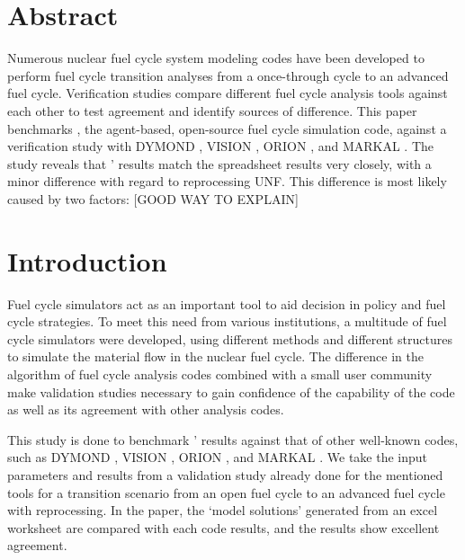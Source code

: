 \section{Abstract}
Numerous nuclear fuel cycle system modeling codes
have been developed to perform fuel cycle transition
analyses from a once-through cycle to an advanced
fuel cycle. Verification studies compare different
fuel cycle analysis tools against each other to
test agreement and identify sources of difference.
This paper benchmarks \Cyclus, the agent-based,
open-source fuel cycle simulation code, against
a verification study \cite{feng_standardized_2016} with
DYMOND \cite{yacout_2005_modeling},
VISION \cite{jacobson_2010_verifiable},
ORION \cite{gregg_2012_analysis}, and
MARKAL \cite{shay_2006_epa}. The study reveals
that \Cyclus' results match the spreadsheet results
very closely, with a minor difference with regard to
reprocessing \gls{UNF}. This difference is most
likely caused by two factors:
[GOOD WAY TO EXPLAIN]

\section{Introduction}
Fuel cycle simulators act as an important tool to
aid decision in policy and fuel cycle strategies.
To meet this need from various institutions, a
multitude of fuel cycle simulators were developed,
using different methods and different structures
to simulate the material flow in the nuclear fuel cycle.
The difference in the algorithm of fuel cycle analysis
codes combined with a small user community make
validation studies necessary to gain
confidence of the capability of the code as well as its
agreement with other analysis codes.

This study is done to benchmark \Cyclus' results
against that of other well-known codes, such as
DYMOND \cite{yacout_2005_modeling},
VISION \cite{jacobson_2010_verifiable},
ORION \cite{gregg_2012_analysis}, and
MARKAL \cite{shay_2006_epa}. We take the input
parameters and results from a validation study
\cite{feng_standardized_2016} already done for the
mentioned tools for a transition scenario from an
open fuel cycle to an advanced fuel cycle with
reprocessing. In the paper, the `model solutions'
generated from an excel worksheet are compared
with each code results, and the results show
excellent agreement.


\subsection{\Cyclus}

